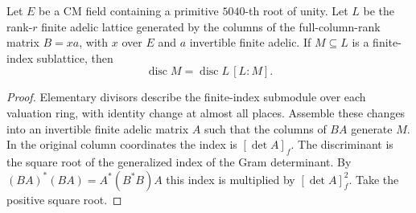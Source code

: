\begin{lemma}
\label{lem:b-discriminant-index}
\emitthmsource
Let $E$ be a CM field containing a primitive $5040$-th root of unity. Let $L$ be the rank-$r$ finite adelic lattice generated by the columns of the full-column-rank matrix $B=xa$, with $x$ over $E$ and $a$ invertible finite adelic. If $M\subseteq L$ is a finite-index sublattice, then
\[
 \operatorname{disc}M=\operatorname{disc}L\,[L:M].
\]
\end{lemma}
\begin{proof}
Elementary divisors describe the finite-index submodule over each valuation ring, with identity change at almost all places. Assemble these changes into an invertible finite adelic matrix $A$ such that the columns of $BA$ generate $M$. In the original column coordinates the index is $[\det A]_f$. The discriminant is the square root of the generalized index of the Gram determinant. By $(BA)^*(BA)=A^*(B^*B)A$ this index is multiplied by $[\det A]_f^2$. Take the positive square root.
\end{proof}

